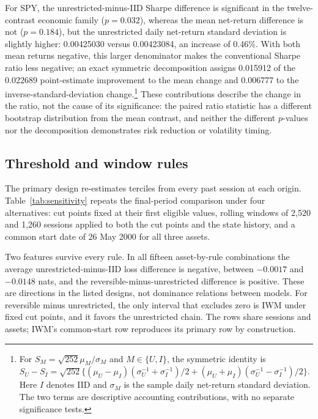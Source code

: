 For SPY, the unrestricted-minus-IID Sharpe difference is significant in the twelve-contrast economic family ($p=0.032$), whereas the mean net-return difference is not ($p=0.184$), but the unrestricted daily net-return standard deviation is slightly higher: 0.00425030 versus 0.00423084, an increase of 0.46\%. With both mean returns negative, this larger denominator makes the conventional Sharpe ratio less negative; an exact symmetric decomposition assigns 0.015912 of the 0.022689 point-estimate improvement to the mean change and 0.006777 to the inverse-standard-deviation change.\footnote{For $S_M=\sqrt{252}\mu_M/\sigma_M$ and $M\in\{U,I\}$, the symmetric identity is $S_U-S_I=\sqrt{252}\{(\mu_U-\mu_I)(\sigma_U^{-1}+\sigma_I^{-1})/2+(\mu_U+\mu_I)(\sigma_U^{-1}-\sigma_I^{-1})/2\}$. Here $I$ denotes IID and $\sigma_M$ is the sample daily net-return standard deviation. The two terms are descriptive accounting contributions, with no separate significance tests.} These contributions describe the change in the ratio, not the cause of its significance: the paired ratio statistic has a different bootstrap distribution from the mean contrast, and neither the different $p$-values nor the decomposition demonstrates risk reduction or volatility timing.

\subsection{Threshold and window rules}\label{sec:sensitivity}
The primary design re-estimates terciles from every past session at each origin. Table~\ref{tab:sensitivity} repeats the final-period comparison under four alternatives: cut points fixed at their first eligible values, rolling windows of 2,520 and 1,260 sessions applied to both the cut points and the state history, and a common start date of 26 May 2000 for all three assets.

Two features survive every rule. In all fifteen asset-by-rule combinations the average unrestricted-minus-IID loss difference is negative, between $-0.0017$ and $-0.0148$ nats, and the reversible-minus-unrestricted difference is positive. These are directions in the listed designs, not dominance relations between models. For reversible minus unrestricted, the only interval that excludes zero is IWM under fixed cut points, and it favors the unrestricted chain. The rows share sessions and assets; IWM's common-start row reproduces its primary row by construction.

